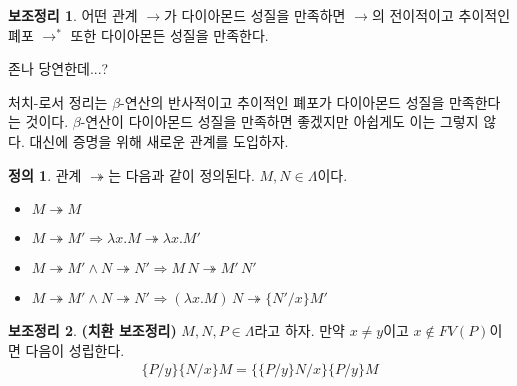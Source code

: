 \documentclass[b5paper]{book}
\theoremstyle{definition}
\newtheorem{defn}{정의}[chapter]
\newtheorem{lem}{보조정리}[chapter]
\newenvironment{pf*}{\pushQED{\qed}\pf}{\popQED\endpf}
\begin{document}
\begin{lem} \label{diamond property lemma}
    어떤 관계 $\rightarrow$가 다이아몬드 성질을 만족하면 $\rightarrow$의 전이적이고 추이적인
    폐포 $\rightarrow^*$ 또한 다이아몬든 성질을 만족한다.
\end{lem}
\begin{pf*}
    존나 당연한데...?
\end{pf*}
처치-로서 정리는 $\beta$-연산의 반사적이고 추이적인 폐포가 다이아몬드 성질을 만족한다는 것이다.
$\beta$-연산이 다이아몬드 성질을 만족하면 좋겠지만 아쉽게도 이는 그렇지 않다. 대신에 
증명을 위해 새로운 관계를 도입하자.
\begin{defn}
    관계 $\twoheadrightarrow$는 다음과 같이 정의된다. $M,N \in \Lambda$이다.
    \begin{itemize}
        \item $M \twoheadrightarrow M $
        \item $M \twoheadrightarrow M' \Rightarrow 
        \lambda x. M \twoheadrightarrow \lambda x. M'$
        \item $M \twoheadrightarrow M' \wedge N \twoheadrightarrow N' \Rightarrow
        M \, N \twoheadrightarrow M' \, N' $
        \item $M \twoheadrightarrow M' \wedge N \twoheadrightarrow N' \Rightarrow
        (\lambda x. M)\, N \twoheadrightarrow \{N'/x\}M'$
    \end{itemize}
\end{defn}
\begin{lem}
    \textbf{(치환 보조정리)} $M, N, P \in \Lambda$라고 하자. 만약 $x \neq y$이고 $x \notin
    FV(P)$이면 다음이 성립한다.
    \begin{align*}
        \{P / y\} \{ N / x\} M = \{ \{P / y\} N / x \} \{P / y\}  M
    \end{align*}
\end{lem}
\end{document}
